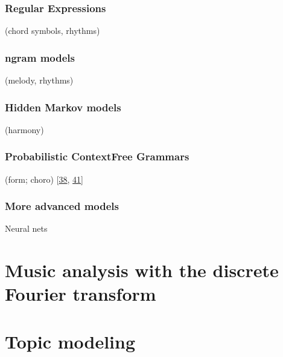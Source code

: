 \documentclass[letterpaper,10pt,english]{sphinxmanual}
\begin{document}
\subsubsection{Regular Expressions}
\label{\detokenize{6_advanced:regular-expressions}}
\sphinxAtStartPar
(chord symbols, rhythms)


\subsubsection{n\sphinxhyphen{}gram models}
\label{\detokenize{6_advanced:n-gram-models}}
\sphinxAtStartPar
(melody, rhythms)


\subsubsection{Hidden Markov models}
\label{\detokenize{6_advanced:hidden-markov-models}}
\sphinxAtStartPar
(harmony)


\subsubsection{Probabilistic Context\sphinxhyphen{}Free Grammars}
\label{\detokenize{6_advanced:probabilistic-context-free-grammars}}
\sphinxAtStartPar
(form; choro) {[}\hyperlink{cite.8_bibliography:id14}{38}, \hyperlink{cite.8_bibliography:id16}{41}{]}


\subsubsection{More advanced models}
\label{\detokenize{6_advanced:more-advanced-models}}
\sphinxAtStartPar
Neural nets


\section{Music analysis with the discrete Fourier transform}
\label{\detokenize{6_advanced:music-analysis-with-the-discrete-fourier-transform}}

\section{Topic modeling}
\label{\detokenize{6_advanced:topic-modeling}}
\cleardoublepage
\begingroup
\renewcommand\chapter[1]{\endgroup}
\end{document}
